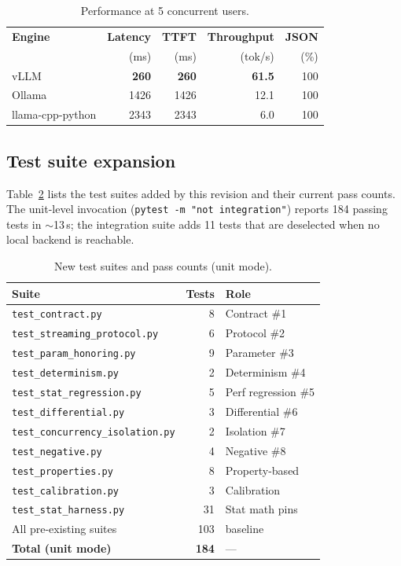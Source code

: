 \documentclass[sigconf,nonacm]{acmart}
\begin{document}
\begin{table}[h]
\centering
\caption{Performance at 5 concurrent users.}
\label{tab:perf}
\small
\begin{tabular}{@{}lrrrr@{}}
\toprule
\textbf{Engine} & \textbf{Latency} & \textbf{TTFT} &
\textbf{Throughput} & \textbf{JSON} \\
 & (ms) & (ms) & (tok/s) & (\%) \\
\midrule
vLLM              & \textbf{260}  & \textbf{260}  & \textbf{61.5} & 100 \\
Ollama            & 1426 & 1426 & 12.1 & 100 \\
llama-cpp-python  & 2343 & 2343 & 6.0  & 100 \\
\bottomrule
\end{tabular}
\end{table}

\subsection{Test suite expansion}
Table~\ref{tab:suites} lists the test suites added by this revision and
their current pass counts. The unit-level invocation
(\texttt{pytest -m "not integration"}) reports 184 passing tests in
$\sim$13\,s; the integration suite adds 11 tests that are deselected when no
local backend is reachable.

\begin{table}[h]
\centering
\caption{New test suites and pass counts (unit mode).}
\label{tab:suites}
\small
\begin{tabular}{@{}lrl@{}}
\toprule
\textbf{Suite} & \textbf{Tests} & \textbf{Role} \\
\midrule
\texttt{test\_contract.py}              & 8 & Contract \#1 \\
\texttt{test\_streaming\_protocol.py}   & 6 & Protocol \#2 \\
\texttt{test\_param\_honoring.py}       & 9 & Parameter \#3 \\
\texttt{test\_determinism.py}           & 2 & Determinism \#4 \\
\texttt{test\_stat\_regression.py}      & 5 & Perf regression \#5 \\
\texttt{test\_differential.py}          & 3 & Differential \#6 \\
\texttt{test\_concurrency\_isolation.py}& 2 & Isolation \#7 \\
\texttt{test\_negative.py}              & 4 & Negative \#8 \\
\texttt{test\_properties.py}            & 8 & Property-based \\
\texttt{test\_calibration.py}           & 3 & Calibration \\
\texttt{test\_stat\_harness.py}         & 31 & Stat math pins \\
\midrule
All pre-existing suites                & 103 & baseline \\
\midrule
\textbf{Total (unit mode)}              & \textbf{184} & --- \\
\bottomrule
\end{tabular}
\end{table}
\end{document}
